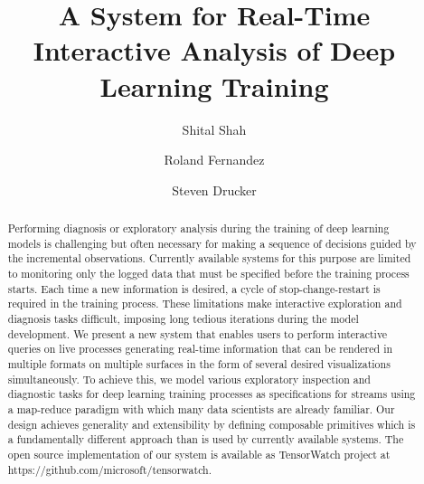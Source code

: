 \documentclass[sigchi]{acmart} %
\begin{document}
%
\title{A System for Real-Time Interactive Analysis of Deep Learning Training}

%
\author{Shital Shah}

\author{Roland Fernandez}

\author{Steven Drucker}

%

%
\begin{abstract}
  Performing diagnosis or exploratory analysis during the training of deep learning models is challenging but often necessary for making a sequence of decisions guided by the incremental observations. Currently available systems for this purpose are limited to monitoring only the logged data that must be specified before the training process starts. Each time a new information is desired, a cycle of stop-change-restart is required in the training process. These limitations make interactive exploration and diagnosis tasks difficult, imposing long tedious iterations during the model development. We present a new system that enables users to perform interactive queries on live processes generating real-time information that can be rendered in multiple formats on multiple surfaces in the form of several desired visualizations simultaneously. To achieve this, we model various exploratory inspection and diagnostic tasks for deep learning training processes as specifications for streams using a map-reduce paradigm with which many data scientists are already familiar. Our design achieves generality and extensibility by defining composable primitives which is a fundamentally different approach than is used by currently available systems. The open source implementation of our system is available as TensorWatch project at https://github.com/microsoft/tensorwatch.
\end{abstract}
\end{document}
